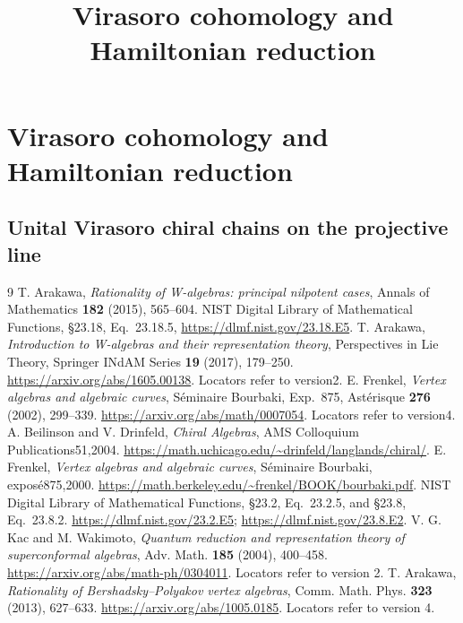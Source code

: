 \documentclass[11pt,oneside]{memoir}
\title{Virasoro cohomology and Hamiltonian reduction}
\author{}
\date{}
\providecommand{\Res}{\operatorname{Res}}
\begin{document}
\chapter{Virasoro cohomology and Hamiltonian reduction}







\begingroup
\providecommand{\Res}{\operatorname{Res}}\providecommand{\Vir}{\operatorname{Vir}}\providecommand{\Aut}{\operatorname{Aut}}

\endgroup
\section{Unital Virasoro chiral chains on the projective line}\label{sec:cbc26-unital-p1}




\begin{thebibliography}{9}
 T. Arakawa, \emph{Rationality of W-algebras: principal nilpotent cases}, Annals of Mathematics \textbf{182} (2015), 565--604.
 NIST Digital Library of Mathematical Functions, \S23.18, Eq.~23.18.5, \url{https://dlmf.nist.gov/23.18.E5}.
 T. Arakawa, \emph{Introduction to W-algebras and their representation theory}, Perspectives in Lie Theory, Springer INdAM Series \textbf{19} (2017), 179--250. \url{https://arxiv.org/abs/1605.00138}. Locators refer to version2.
 E. Frenkel, \emph{Vertex algebras and algebraic curves}, S\'eminaire Bourbaki, Exp.~875, Ast\'erisque \textbf{276} (2002), 299--339. \url{https://arxiv.org/abs/math/0007054}. Locators refer to version4.
 A. Beilinson and V. Drinfeld, \emph{Chiral Algebras}, AMS Colloquium Publications51,2004. \url{https://math.uchicago.edu/~drinfeld/langlands/chiral/}.
 E. Frenkel, \emph{Vertex algebras and algebraic curves}, S\'eminaire Bourbaki, expos\'e875,2000. \url{https://math.berkeley.edu/~frenkel/BOOK/bourbaki.pdf}.
 NIST Digital Library of Mathematical Functions, \S23.2, Eq.~23.2.5, and \S23.8, Eq.~23.8.2. \url{https://dlmf.nist.gov/23.2.E5}; \url{https://dlmf.nist.gov/23.8.E2}.
 V. G. Kac and M. Wakimoto, \emph{Quantum reduction and representation theory of superconformal algebras}, Adv. Math. \textbf{185} (2004), 400--458. \url{https://arxiv.org/abs/math-ph/0304011}. Locators refer to version 2.
 T. Arakawa, \emph{Rationality of Bershadsky--Polyakov vertex algebras}, Comm. Math. Phys. \textbf{323} (2013), 627--633. \url{https://arxiv.org/abs/1005.0185}. Locators refer to version 4.
\end{thebibliography}
\end{document}
